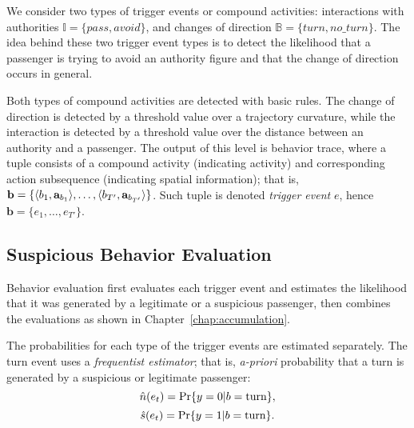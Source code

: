 We consider two types of trigger events or compound activities: interactions with authorities $\mathbb{I}=\{pass, avoid\}$, and changes of direction $\mathbb{B}=\{turn, no\_turn\}$. The idea behind these two trigger event types is to detect the likelihood that a passenger is trying to avoid an authority figure and that the change of direction occurs in general.

Both types of compound activities are detected with basic rules. The change of direction is detected by a threshold value over a trajectory curvature, while the interaction is detected by a threshold value over the distance between an authority and a passenger. The output of this level is behavior trace, where a tuple consists of a compound activity (indicating activity) and corresponding action subsequence (indicating spatial information); that is, 
$\mathbf{b}=\{\langle b_1, \mathbf{a}_{b_1} \rangle, \dots, \langle b_{T'}, \mathbf{a}_{b_{T'}} \rangle\}$. Such tuple is denoted \emph{trigger event} $e$, hence $\mathbf{b}=\{e_1, \dots, e_{T'}\}$.

%
%
\subsection{Suspicious Behavior Evaluation}

Behavior evaluation first evaluates each trigger event and estimates the likelihood that it was generated by a legitimate or a suspicious passenger, then combines the evaluations as shown in Chapter~\ref{chap:accumulation}.

The probabilities for each type of the trigger events are estimated separately. The turn event uses a \emph{frequentist estimator}; that is, \emph{a-priori} probability that a turn is generated by a suspicious or legitimate passenger:
\begin{equation}
		\hat{n}(e_t) = \text{Pr}\{y=0|b=\text{turn}\},
\label{eq:freq-n}
\end{equation}
\begin{equation}
		\hat{s}(e_t) = \text{Pr}\{y=1|b=\text{turn}\}.
\label{eq:freq-n}
\end{equation}

